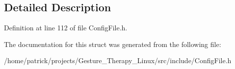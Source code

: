 \subsection{Detailed Description}


Definition at line 112 of file Config\+File.\+h.



The documentation for this struct was generated from the following file\+:\begin{DoxyCompactItemize}
\item 
/home/patrick/projects/\+Gesture\+\_\+\+Therapy\+\_\+\+Linux/src/include/Config\+File.\+h\end{DoxyCompactItemize}
